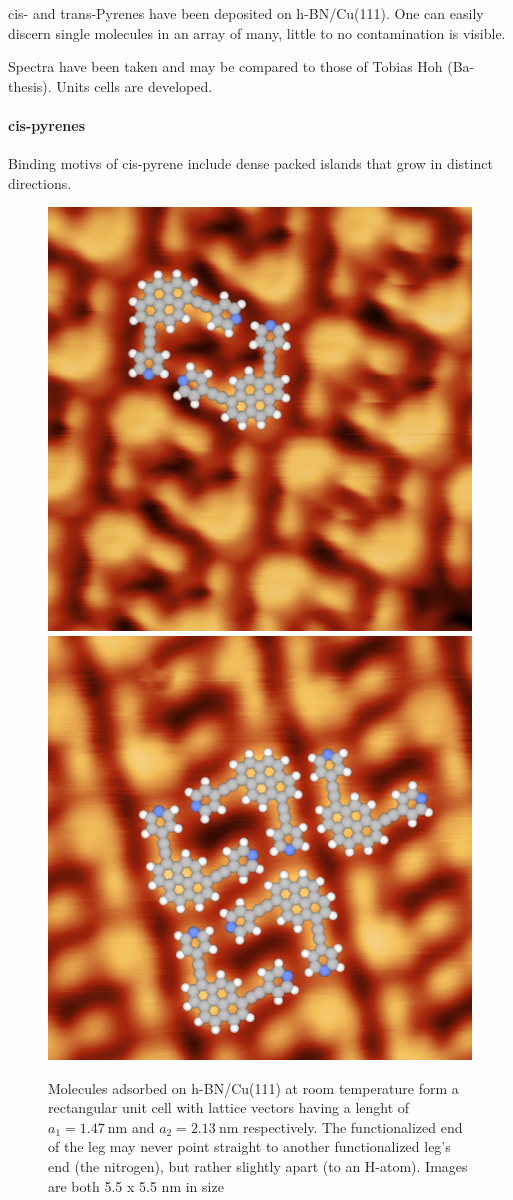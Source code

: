 cis- and trans-Pyrenes have been deposited on h-BN/Cu(111).
One can easily discern single molecules in an array of many, little to no contamination is visible.

Spectra have been taken and may be compared to those of Tobias Hoh (Ba-thesis). Units cells are developed.

\paragraph {cis-pyrenes}
Binding motivs of cis-pyrene include dense packed islands that grow in distinct directions. 
\begin{figure}[!h]
\centering
 \includegraphics[height=0.45\textwidth]{./images/F160624-182952-model.png}
 \includegraphics[height=0.45\textwidth]{./images/F160624-171335-model.png}
 \caption{Molecules adsorbed on h-BN/Cu(111) at room temperature form a rectangular unit cell with lattice vectors having a lenght of $a_1 = \SI{1.47}{\nano \meter}$ and $a_2 = \SI{2.13}{\nano \meter}$ respectively. The functionalized end of the leg may never point straight to another functionalized leg's end (the nitrogen), but rather slightly apart (to an H-atom). Images are both 5.5 x 5.5 nm in size}
\end{figure}

